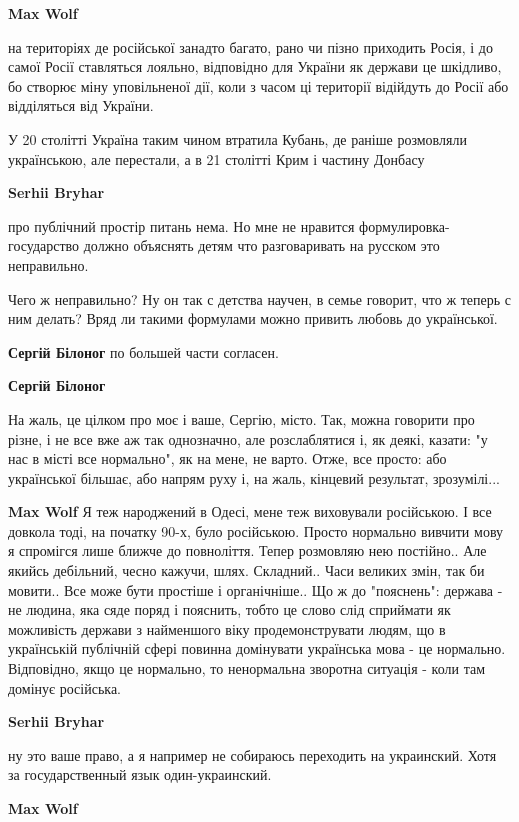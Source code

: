 \begin{itemize}
\begin{itemize}
\textbf{Max Wolf} 

на територіях де російської занадто багато, рано чи пізно приходить Росія, і до
самої Росії ставляться лояльно, відповідно для України як держави це шкідливо,
бо створює міну уповільненої дії, коли з часом ці території відійдуть до Росії
або відділяться від України.

У 20 столітті Україна таким чином втратила Кубань, де раніше розмовляли
українською, але перестали, а в 21 столітті Крим і частину Донбасу

\textbf{Serhii Bryhar} 

про публічний простір питань нема. Но мне не нравится формулировка-государство
должно объяснять детям что разговаривать на русском это неправильно.

Чего ж неправильно? Ну он так с детства научен, в семье говорит, что ж теперь с
ним делать? Вряд ли такими формулами можно привить любовь до української.

\textbf{Сергій Білоног} по большей части согласен.

\textbf{Сергій Білоног} 

На жаль, це цілком про моє і ваше, Сергію, місто. Так,
можна говорити про різне, і не все вже аж так однозначно, але розслаблятися і,
як деякі, казати: "у нас в місті все нормально", як на мене, не варто. Отже,
все просто: або української більшає, або напрям руху і, на жаль, кінцевий
результат, зрозумілі...

\textbf{Max Wolf} Я теж народжений в Одесі, мене теж виховували російською. І
все довкола тоді, на початку 90-х, було російською. Просто нормально вивчити
мову я спромігся лише ближче до повноліття. Тепер розмовляю нею постійно.. Але
якийсь дебільний, чесно кажучи, шлях. Складний.. Часи великих змін, так би
мовити.. Все може бути простіше і органічніше.. Що ж до "пояснень": держава -
не людина, яка сяде поряд і пояснить, тобто це слово слід сприймати як
можливість держави з найменшого віку продемонструвати людям, що в українській
публічній сфері повинна домінувати українська мова - це нормально. Відповідно,
якщо це нормально, то ненормальна зворотна ситуація - коли там домінує
російська.

\textbf{Serhii Bryhar} 

ну это ваше право, а я например не собираюсь переходить
на украинский. Хотя за государственный язык один-украинский.

\textbf{Max Wolf} 


\end{itemize}
\end{itemize}
